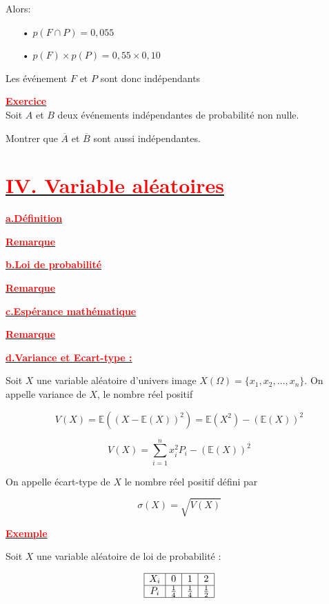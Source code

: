 \documentclass[12pt,a4paper]{article}
\begin{document}
Alors:
\begin{itemize}
\item[•] $p(F\cap P)=0,055$
\item[•] $p(F)\times p(P)=0,55\times 0,10$
\end{itemize}
Les événement $F$ et $P$ sont donc indépendants

\underline{\textbf{\textcolor{red}{Exercice}}}\\
Soit $A$ et $B$ deux événements indépendantes de probabilité non nulle.

Montrer que $\overline{A}$ et $\overline{B}$ sont aussi indépendantes.
\section*{\underline{\textbf{\textcolor{red}{IV. Variable aléatoires}}}}
\underline{\textbf{\textcolor{red}{a.Définition}}}

\underline{\textbf{\textcolor{red}{Remarque}}}

\underline{\textbf{\textcolor{red}{b.Loi de probabilité}}}

\underline{\textbf{\textcolor{red}{Remarque}}}

\underline{\textbf{\textcolor{red}{c.Espérance mathématique}}}

\underline{\textbf{\textcolor{red}{Remarque}}}

\underline{\textbf{\textcolor{red}{d.Variance et Ecart-type :}}}

Soit \( X \) une variable aléatoire d'univers image \( X(\Omega) = \{ x_1, x_2, \dots, x_n \} \). On appelle variance de \( X \), le nombre réel positif

\[
V(X) = \mathbb{E} \left( (X - \mathbb{E}(X))^2 \right) = \mathbb{E}(X^2) - (\mathbb{E}(X))^2
\]

\[
V(X) = \sum_{i=1}^{n} x_i^2 P_i - (\mathbb{E}(X))^2
\]

On appelle écart-type de \( X \) le nombre réel positif défini par

\[
\sigma(X) = \sqrt{V(X)}
\]

\underline{\textbf{\textcolor{red}{Exemple}}}

Soit \( X \) une variable aléatoire de loi de probabilité :

\[
\begin{array}{|c|c|c|c|}
\hline
X_i & 0 & 1 & 2 \\
\hline
P_i & \frac{1}{4} & \frac{1}{4} & \frac{1}{2} \\
\hline
\end{array}
\]
\end{document}

